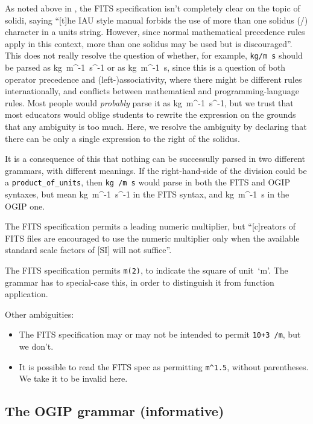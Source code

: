 \documentclass[11pt,notitlepage,onecolumn]{ivoa}
\makeatletter
\def\units{\@ifstar{\let\un@tsspace\relax    \un@ts}%
                   {\let\un@tsspace\thinspace\un@ts}}
\newcommand{\un@ts}[1]{{\let~\thinspace
  \ifmmode
    \un@tsspace\mathrm{#1}%
  \else
    \nobreak$\un@tsspace\mathrm{#1}$%
  \fi}}
\makeatother
\begin{document}
As noted above in , 
the FITS specification isn't completely clear on the topic of 
solidi, saying ``[t]he IAU style manual forbids
the use of more than one solidus (/) character in a units
string. However, since normal mathematical precedence rules apply
in this context, more than one solidus may be used but is
discouraged''.  This does not really resolve the question of whether, for
example, \texttt{kg/m s} should be parsed as \units{kg~m^{-1}~s^{-1}}
or as \units{kg~m^{-1}~s}, since this is a question of both operator
precedence and (left-)associativity, where there might be different
rules internationally, and conflicts between mathematical and
programming-language rules.  Most people would \emph{probably} parse
it as \units{kg~m^{-1}~s^{-1}}, but we trust that most educators would
oblige students to rewrite the expression on the grounds that any
ambiguity is too much.
Here, we resolve the ambiguity by declaring that there can
be only a single expression to the right of the solidus.

It is a consequence of this that nothing can be
successully parsed in two different grammars, with different
meanings.  If the right-hand-side of the division could be a
\texttt{product\_of\_units}, then \texttt{kg /m s} would parse in both
the FITS and OGIP syntaxes,
but mean \units{kg~m^{-1}~s^{-1}} in the FITS syntax, and
\units{kg~m^{-1}~s} in the OGIP one.

The FITS specification permits a leading numeric multiplier, but
``[c]reators of FITS files are encouraged to use the numeric
multiplier only when the available standard scale factors of [SI] will
not suffice''.

The FITS specification permits \texttt{m(2)}, to indicate the square of
unit~`m'.  The grammar has to special-case this, in order to
distinguish it from function application.

Other ambiguities:
\begin{itemize}
\item The FITS specification may or may not be intended to permit 
  \texttt{10+3 /m}, but we don't.
\item It is possible to read the FITS spec as permitting
  \texttt{m\^{}1.5}, without parentheses.  We take it to be
  invalid here.
\end{itemize}

\subsection{The OGIP grammar (informative)}
\label{appx:ogipgrammar}
\end{document}
